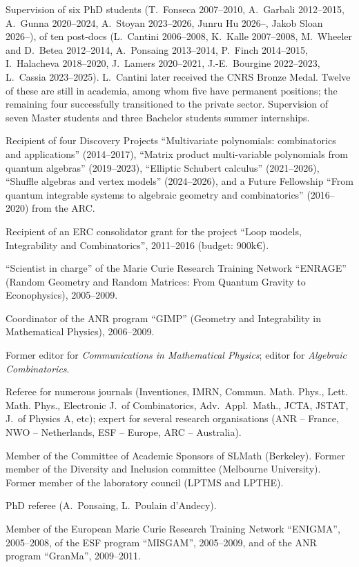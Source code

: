 \begin{cvbullets}
\item Supervision of six PhD students (T.~Fonseca 2007--2010, A.~Garbali 2012--2015, A.~Gunna 2020--2024, A.~Stoyan 2023--2026, Junru Hu 2026--, Jakob Sloan 2026--), of ten post-docs (L.~Cantini 2006--2008, K.~Kalle 2007--2008, M.~Wheeler and D.~Betea 2012--2014, A.~Ponsaing 2013--2014, P.~Finch 2014--2015, I.~Halacheva 2018--2020, J.~Lamers 2020--2021, J.-E.~Bourgine 2022--2023, L.~Cassia 2023--2025). L.~Cantini later received the CNRS Bronze Medal. Twelve of these are still in academia, among whom five have permanent positions; the remaining four successfully transitioned to the private sector. Supervision of seven Master students and three Bachelor students summer internships.
\item Recipient of four Discovery Projects ``Multivariate polynomials: combinatorics and applications'' (2014--2017), ``Matrix product multi-variable polynomials from quantum algebras'' (2019--2023), ``Elliptic Schubert calculus'' (2021--2026), ``Shuffle algebras and vertex models'' (2024--2026), and a Future Fellowship ``From quantum integrable systems to algebraic geometry and combinatorics'' (2016--2020) from the ARC.
\item Recipient of an ERC consolidator grant for the project ``Loop models, Integrability and Combinatorics'', 2011--2016 (budget: 900k\euro).
\item ``Scientist in charge'' of the Marie Curie Research Training Network ``ENRAGE'' (Random Geometry and Random Matrices: From Quantum Gravity to Econophysics), 2005--2009.
\item Coordinator of the ANR program ``GIMP'' (Geometry and Integrability in Mathematical Physics), 2006--2009.
\item Former editor for {\em Communications in Mathematical Physics}; editor for {\em Algebraic Combinatorics}.
\item Referee for numerous journals (Inventiones, IMRN, Commun. Math. Phys., Lett. Math. Phys., Electronic J.\ of Combinatorics, Adv.\ Appl.\ Math., JCTA, JSTAT, J.\ of Physics A, etc); expert for several research organisations (ANR -- France, NWO -- Netherlands, ESF -- Europe, ARC -- Australia).
\item Member of the Committee of Academic Sponsors of SLMath (Berkeley). Former member of the Diversity and Inclusion committee (Melbourne University). Former member of the laboratory council (LPTMS and LPTHE).
\item PhD referee (A.~Ponsaing, L.~Poulain d'Andecy).
\item Member of the European Marie Curie Research Training Network ``ENIGMA'', 2005--2008, of the ESF program ``MISGAM'', 2005--2009, and of the ANR program ``GranMa'', 2009--2011.
\end{cvbullets}

